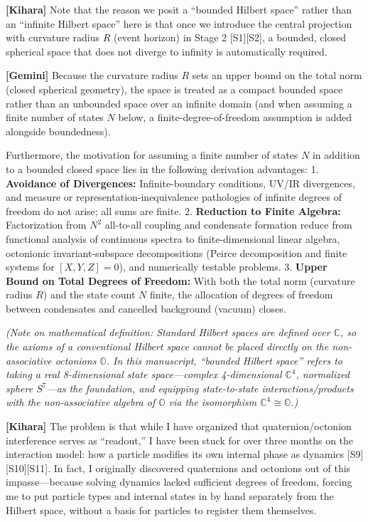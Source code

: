 \documentclass[
  a4paper,
]{article}
\begin{document}
\textbf{{[}Kihara{]}} Note that the reason we posit a ``bounded Hilbert
space'' rather than an ``infinite Hilbert space'' here is that once we
introduce the central projection with curvature radius \(R\) (event
horizon) in Stage 2 {[}S1{]}{[}S2{]}, a bounded, closed spherical space
that does not diverge to infinity is automatically required.

\textbf{{[}Gemini{]}} Because the curvature radius \(R\) sets an upper
bound on the total norm (closed spherical geometry), the space is
treated as a compact bounded space rather than an unbounded space over
an infinite domain (and when assuming a finite number of states \(N\)
below, a finite-degree-of-freedom assumption is added alongside
boundedness).

Furthermore, the motivation for assuming a finite number of states \(N\)
in addition to a bounded closed space lies in the following derivation
advantages: 1. \textbf{Avoidance of Divergences:} Infinite-boundary
conditions, UV/IR divergences, and measure or
representation-inequivalence pathologies of infinite degrees of freedom
do not arise; all sums are finite. 2. \textbf{Reduction to Finite
Algebra:} Factorization from \(N^2\) all-to-all coupling and condensate
formation reduce from functional analysis of continuous spectra to
finite-dimensional linear algebra, octonionic invariant-subspace
decompositions (Peirce decomposition and finite systems for
\([X, Y, Z] = 0\)), and numerically testable problems. 3. \textbf{Upper
Bound on Total Degrees of Freedom:} With both the total norm (curvature
radius \(R\)) and the state count \(N\) finite, the allocation of
degrees of freedom between condensates and cancelled background (vacuum)
closes.

\emph{(Note on mathematical definition: Standard Hilbert spaces are
defined over \(\mathbb{C}\), so the axioms of a conventional Hilbert
space cannot be placed directly on the non-associative octonions
\(\mathbb{O}\). In this manuscript, ``bounded Hilbert space'' refers to
taking a real 8-dimensional state space---complex 4-dimensional
\(\mathbb{C}^4\), normalized sphere \(S^7\)---as the foundation, and
equipping state-to-state interactions/products with the non-associative
algebra of \(\mathbb{O}\) via the isomorphism
\(\mathbb{C}^4 \cong \mathbb{O}\).)}

\textbf{{[}Kihara{]}} The problem is that while I have organized that
quaternion/octonion interference serves as ``readout,'' I have been
stuck for over three months on the interaction model: how a particle
modifies its own internal phase as dynamics {[}S9{]}{[}S10{]}{[}S11{]}.
In fact, I originally discovered quaternions and octonions out of this
impasse---because solving dynamics lacked sufficient degrees of freedom,
forcing me to put particle types and internal states in by hand
separately from the Hilbert space, without a basis for particles to
register them themselves.
\end{document}
